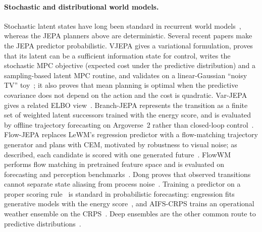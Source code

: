 \paragraph{Stochastic and distributional world models.}
Stochastic latent states have long been standard in recurrent world models~\cite{hafner2019planet,hafner2025dreamerv3}, whereas the JEPA planners above are deterministic. Several recent papers make the JEPA predictor probabilistic. VJEPA gives a variational formulation, proves that its latent can be a sufficient information state for control, writes the stochastic MPC objective (expected cost under the predictive distribution) and a sampling-based latent MPC routine, and validates on a linear-Gaussian ``noisy TV'' toy~\cite{huang2026vjepa}; it also proves that mean planning is optimal when the predictive covariance does not depend on the action and the cost is quadratic. Var-JEPA gives a related ELBO view~\cite{gogl2026varjepa}. Branch-JEPA represents the transition as a finite set of weighted latent successors trained with the energy score, and is evaluated by offline trajectory forecasting on Argoverse~2 rather than closed-loop control~\cite{song2026branchjepa}. Flow-JEPA replaces LeWM's regression predictor with a flow-matching trajectory generator and plans with CEM, motivated by robustness to visual noise; as described, each candidate is scored with one generated future~\cite{huo2026flowjepa}. FlowWM performs flow matching in pretrained feature space and is evaluated on forecasting and perception benchmarks~\cite{porcher2026flowwm}. Dong proves that observed transitions cannot separate state aliasing from process noise~\cite{dong2026closure}. Training a predictor on a proper scoring rule~\cite{gneiting2007scoring} is standard in probabilistic forecasting: engression fits generative models with the energy score~\cite{shen2025engression}, and AIFS-CRPS trains an operational weather ensemble on the CRPS~\cite{lang2024aifscrps}. Deep ensembles are the other common route to predictive distributions~\cite{lakshminarayanan2017ensembles,chua2018pets}.

